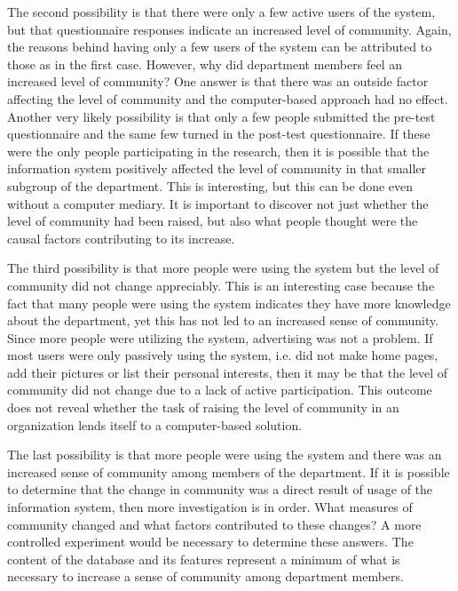 The second possibility is that there were only a few active users of the
system, but that questionnaire responses indicate an increased level of
community.  Again, the reasons behind having only a few users of the system can
be attributed to those as in the first case.  However, why did department
members feel an increased level of community?  One answer is that there was an
outside factor affecting the level of community and the computer-based approach
had no effect.  Another very likely possibility is that only a few people
submitted the pre-test questionnaire and the same few turned in the post-test
questionnaire.  If these were the only people participating in the research,
then it is possible that the information system positively affected the level
of community in that smaller subgroup of the department.  This is interesting,
but this can be done even without a computer mediary.  It is important to
discover not just whether the level of community had been raised, but also what
people thought were the causal factors contributing to its increase.

The third possibility is that more people were using the system but the level
of community did not change appreciably.  This is an interesting case because
the fact that many people were using the system indicates they have more
knowledge about the department, yet this has not led to an increased sense of
community.  Since more people were utilizing the system, advertising was not a
problem.  If most users were only passively using the system, i.e. did not make
home pages, add their pictures or list their personal interests, then it may be
that the level of community did not change due to a lack of active
participation.  This outcome does not reveal whether the task of raising the
level of community in an organization lends itself to a computer-based
solution.

The last possibility is that more people were using the system and there was an
increased sense of community among members of the department.  If it is
possible to determine that the change in community was a direct result of usage
of the information system, then more investigation is in order.  What measures
of community changed and what factors contributed to these changes?  A more
controlled experiment would be necessary to determine these answers.  The
content of the database and its features represent a minimum of what is
necessary to increase a sense of community among department members.
